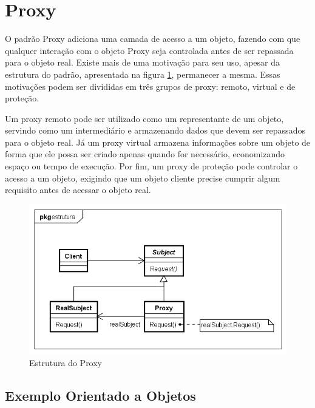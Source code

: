\section{Proxy}

O padrão Proxy adiciona uma camada de acesso 
a um objeto, fazendo com que qualquer interação 
com o objeto Proxy seja controlada antes de ser 
repassada para o objeto real. Existe mais 
de uma motivação para seu uso, apesar 
da estrutura do padrão, 
apresentada na figura \ref{proxy_struct},  
permanecer a mesma. Essas motivações 
podem ser divididas em três grupos de 
proxy: remoto, virtual e de proteção. 

Um proxy remoto pode ser utilizado como um 
representante de um objeto, servindo como um 
intermediário e armazenando dados que devem 
ser repassados para o objeto real. Já um 
proxy virtual armazena informações sobre 
um objeto de forma que ele possa ser criado 
apenas quando for necessário, economizando 
espaço ou tempo de execução. Por fim, um 
proxy de proteção pode controlar o acesso 
a um objeto, exigindo que um objeto cliente 
precise cumprir algum requisito antes de 
acessar o objeto real. 

\begin{figure}[htb]
	\caption{\label{proxy_struct}Estrutura do Proxy}
	\begin{center}
	    \includegraphics[scale=0.5]{5_padroes-contexto-funcional/5.2_estruturais/5.2.7_proxy/proxy_estrutura.png}
	\end{center}
\end{figure}

\subsection*{Exemplo Orientado a Objetos}


